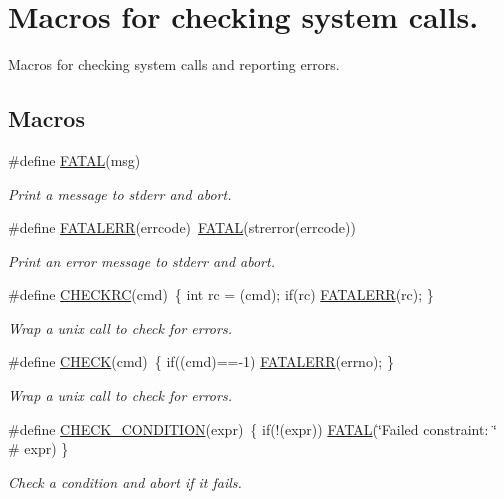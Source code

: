 \hypertarget{group__check__macros}{}\section{Macros for checking system calls.}
\label{group__check__macros}


Macros for checking system calls and reporting errors.  


\subsection*{Macros}
\begin{DoxyCompactItemize}
\item 
\#define \hyperlink{group__check__macros_ga7a3e1d362790a375466c5e77a6d5c9c5}{F\+A\+T\+AL}(msg)
\begin{DoxyCompactList}\small\item\em Print a message to stderr and abort. \end{DoxyCompactList}\item 
\#define \hyperlink{group__check__macros_gab2b3925a76d34a1272ace73af5a81945}{F\+A\+T\+A\+L\+E\+RR}(errcode)~\hyperlink{group__check__macros_ga7a3e1d362790a375466c5e77a6d5c9c5}{F\+A\+T\+AL}(strerror(errcode))
\begin{DoxyCompactList}\small\item\em Print an error message to stderr and abort. \end{DoxyCompactList}\item 
\#define \hyperlink{group__check__macros_ga879857ca00d32faa0d6cfe416428a804}{C\+H\+E\+C\+K\+RC}(cmd)~\{ int rc = (cmd); if(rc) \hyperlink{group__check__macros_gab2b3925a76d34a1272ace73af5a81945}{F\+A\+T\+A\+L\+E\+RR}(rc); \}
\begin{DoxyCompactList}\small\item\em Wrap a unix call to check for errors. \end{DoxyCompactList}\item 
\#define \hyperlink{group__check__macros_ga1992445028206dcca9c93c9a0b558436}{C\+H\+E\+CK}(cmd)~\{ if((cmd)==-\/1) \hyperlink{group__check__macros_gab2b3925a76d34a1272ace73af5a81945}{F\+A\+T\+A\+L\+E\+RR}(errno); \}
\begin{DoxyCompactList}\small\item\em Wrap a unix call to check for errors. \end{DoxyCompactList}\item 
\#define \hyperlink{group__check__macros_ga6196238e8ab53ab90e7bf7ab51fc73e9}{C\+H\+E\+C\+K\+\_\+\+C\+O\+N\+D\+I\+T\+I\+ON}(expr)~\{ if(!(expr)) \hyperlink{group__check__macros_ga7a3e1d362790a375466c5e77a6d5c9c5}{F\+A\+T\+AL}(\char`\"{}Failed constraint\+: \char`\"{} \# expr) \}
\begin{DoxyCompactList}\small\item\em Check a condition and abort if it fails. \end{DoxyCompactList}\end{DoxyCompactItemize}
